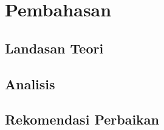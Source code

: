 \chapter{Pembahasan}

\section{Landasan Teori}

\section{Analisis}

\section{Rekomendasi Perbaikan}



